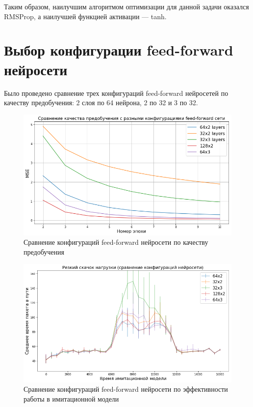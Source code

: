 \documentclass[specification, annotation]{itmo-student-thesis}
\begin{document}
Таким образом, наилучшим алгоритмом оптимизации для данной задачи оказался
RMSProp, а наилучшей функцией активации --- tanh.

\section{Выбор конфигурации feed-forward нейросети}

Было проведено сравнение трех конфигураций feed-forward нейросетей по качеству
предобучения: 2 слоя по 64 нейрона, 2 по 32 и 3 по 32.

\begin{figure}[!h]
  \caption{Сравнение конфигураций feed-forward нейросети по качеству
    предобучения}\label{experiment-layers-pretrain}
  \centering
  \includegraphics[scale=0.6]{experiment-layers-pretrain}
\end{figure}

\begin{figure}[!h]
  \caption{Сравнение конфигураций feed-forward нейросети по эффективности работы
    в имитационной модели}\label{experiment-layers-launch}
  \centering
  \includegraphics[scale=0.6]{experiment-layers-launch}
\end{figure}
\end{document}
